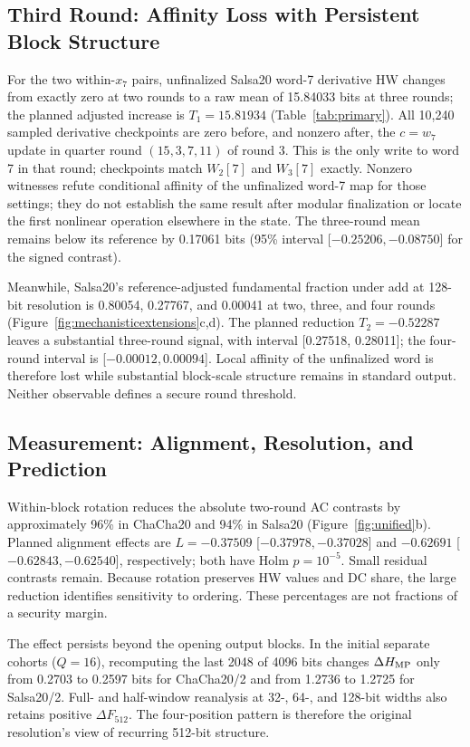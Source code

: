 \documentclass[electronics,article,submit,pdftex,oneauthor]{Definitions/mdpi}
\begin{document}
\subsection{Third Round: Affinity Loss with Persistent Block Structure}\label{sec:transition}

For the two within-$x_7$ pairs, unfinalized Salsa20 word-7 derivative HW changes from exactly zero at two rounds to a raw mean of 15.84033 bits at three rounds; the planned adjusted increase is $T_1=15.81934$ (Table~\ref{tab:primary}). All 10,240 sampled derivative checkpoints are zero before, and nonzero after, the $c=w_7$ update in quarter round $(15,3,7,11)$ of round 3. This is the only write to word 7 in that round; checkpoints match $W_2[7]$ and $W_3[7]$ exactly. Nonzero witnesses refute conditional affinity of the unfinalized word-7 map for those settings; they do not establish the same result after modular finalization or locate the first nonlinear operation elsewhere in the state. The three-round mean remains below its reference by 0.17061 bits (95\% interval [$-0.25206,-0.08750$] for the signed contrast).

Meanwhile, Salsa20's reference-adjusted fundamental fraction under add at 128-bit resolution is 0.80054, 0.27767, and 0.00041 at two, three, and four rounds (Figure~\ref{fig:mechanisticextensions}c,d). The planned reduction $T_2=-0.52287$ leaves a substantial three-round signal, with interval [0.27518, 0.28011]; the four-round interval is [$-0.00012,0.00094$]. Local affinity of the unfinalized word is therefore lost while substantial block-scale structure remains in standard output. Neither observable defines a secure round threshold.

\subsection{Measurement: Alignment, Resolution, and Prediction}\label{sec:measurementresults}

Within-block rotation reduces the absolute two-round AC contrasts by approximately 96\% in ChaCha20 and 94\% in Salsa20 (Figure~\ref{fig:unified}b). Planned alignment effects are $L=-0.37509$ [$-0.37978,-0.37028$] and $-0.62691$ [$-0.62843,-0.62540$], respectively; both have Holm $p=10^{-5}$. Small residual contrasts remain. Because rotation preserves HW values and DC share, the large reduction identifies sensitivity to ordering. These percentages are not fractions of a security margin.

The effect persists beyond the opening output blocks. In the initial separate cohorts ($Q=16$), recomputing the last 2048 of 4096 bits changes $\Delta H_{\rm MP}$ only from 0.2703 to 0.2597 bits for ChaCha20/2 and from 1.2736 to 1.2725 for Salsa20/2. Full- and half-window reanalysis at 32-, 64-, and 128-bit widths also retains positive $\Delta F_{512}$. The four-position pattern is therefore the original resolution's view of recurring 512-bit structure.
\end{document}
